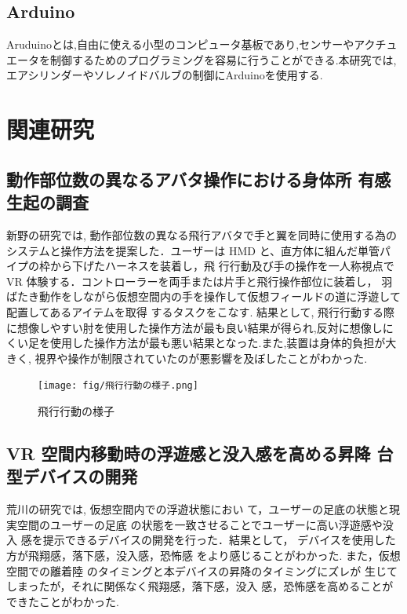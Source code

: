 \subsection{Arduino}

Aruduinoとは,自由に使える小型のコンピュータ基板であり,センサーやアクチュエータを制御するためのプログラミングを容易に行うことができる.本研究では,エアシリンダーやソレノイドバルブの制御にArduinoを使用する.

\section{関連研究}

\subsection{動作部位数の異なるアバタ操作における身体所
有感生起の調査}

新野の研究では, 動作部位数の異なる飛行アバタで手と翼を同時に使用する為のシステムと操作方法を提案した．ユーザーは HMD と、直方体に組んだ単管パイプの枠から下げたハーネスを装着し，飛
行行動及び手の操作を一人称視点で VR 体験する．コントローラーを両手または片手と飛行操作部位に装着し，
羽ばたき動作をしながら仮想空間内の手を操作して仮想フィールドの道に浮遊して配置してあるアイテムを取得
するタスクをこなす.
結果として, 飛行行動する際に想像しやすい肘を使用した操作方法が最も良い結果が得られ,反対に想像しにくい足を使用した操作方法が最も悪い結果となった.また,装置は身体的負担が大きく, 視界や操作が制限されていたのが悪影響を及ぼしたことがわかった.

\begin{figure}[htbp]
  \centering
  \texttt{[image: fig/飛行行動の様子.png]}
  \caption{飛行行動の様子}
  \label{fig:chart1}
\end{figure}


\subsection{VR 空間内移動時の浮遊感と没入感を高める昇降
台型デバイスの開発}

荒川の研究では, 仮想空間内での浮遊状態におい
て，ユーザーの足底の状態と現実空間のユーザーの足底
の状態を一致させることでユーザーに高い浮遊感や没入
感を提示できるデバイスの開発を行った．結果として，
デバイスを使用した方が飛翔感，落下感，没入感，恐怖感
をより感じることがわかった. また，仮想空間での離着陸
のタイミングと本デバイスの昇降のタイミングにズレが
生じてしまったが，それに関係なく飛翔感，落下感，没入
感，恐怖感を高めることができたことがわかった.

